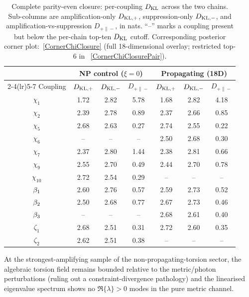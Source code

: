 \begin{table}[h]
  \centering
  \footnotesize
  \setlength{\tabcolsep}{4pt}
  \begin{tabular}{c | ccc | ccc}
  \toprule
    & \multicolumn{3}{c|}{NP control ($\xi=0$)}
    & \multicolumn{3}{c}{Propagating (18D)} \\
  \cmidrule(lr){2-4}\cmidrule(lr){5-7}
  Coupling & $D_\mathrm{KL,+}$ & $D_\mathrm{KL,-}$ & $D_{+\|-}$ & $D_\mathrm{KL,+}$ & $D_\mathrm{KL,-}$ & $D_{+\|-}$ \\
  \midrule
  $\chi_{1}$  & 1.72 & 2.82 & 5.78 & 1.68 & 2.82 & 4.18 \\
  $\chi_{2}$  & 2.39 & 2.78 & 0.89 & 2.37 & 2.66 & 0.85 \\
  $\chi_{5}$  & 2.68 & 2.63 & 0.27 & 2.74 & 2.55 & 0.22 \\
  $\chi_{6}$  & --   & --   & --   & 2.50 & 2.68 & 0.30 \\
  $\chi_{7}$  & 2.37 & 2.80 & 1.44 & 2.38 & 2.81 & 0.66 \\
  $\chi_{9}$  & 2.55 & 2.70 & 0.49 & 2.44 & 2.70 & 0.78 \\
  $\chi_{10}$ & 2.72 & 2.54 & 0.29 & --   & --   & --   \\
  $\beta_{1}$   & 2.60 & 2.76 & 0.57 & 2.59 & 2.73 & 0.52 \\
  $\beta_{2}$   & 2.50 & 2.68 & 0.77 & 2.67 & 2.73 & 0.46 \\
  $\beta_{3}$   & --   & --   & --   & 2.68 & 2.61 & 0.40 \\
  $\zeta_1$   & 2.68 & 2.51 & 0.31 & 2.72 & 2.60 & 0.35 \\
  $\zeta_2$   & 2.62 & 2.51 & 0.38 & --   & --   & --   \\
  \bottomrule
  \end{tabular}
  \caption{Complete parity-even closure: per-coupling $D_\mathrm{KL}$ across
    the two chains. Sub-columns are amplification-only
    $D_\mathrm{KL,+}$, suppression-only $D_\mathrm{KL,-}$,
    and amplification-vs-suppression
    $D_{+\|-}$, in nats. ``--'' marks a
    coupling present but below the per-chain top-ten $D_\mathrm{KL}$ cutoff.
    Corresponding posterior corner plot:~\cref{CornerChiClosure}
    (full 18-dimensional overlay; restricted top-6 in
   ~\cref{CornerChiClosurePair}).}
  \label{KLTableChiClosureComparison}
\end{table}

At the strongest-amplifying sample of the non-propagating-torsion
sector, the algebraic torsion field remains bounded relative to the
metric/photon perturbations (ruling out a constraint-divergence
pathology) and the linearised eigenvalue spectrum shows no
$\Re\{\lambda\} > 0$ modes in the pure metric channel.

